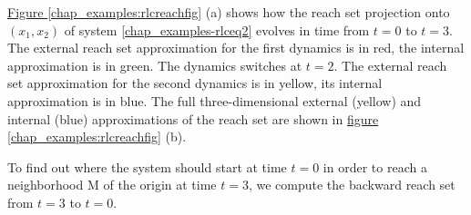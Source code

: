 \documentclass[letterpaper,10pt,english]{sphinxmanual}
\begin{document}
\hyperref[chap_examples:rlcreachfig]{Figure  \ref*{chap_examples:rlcreachfig}} (a) shows how the reach set projection onto
$(x_1, x_2)$ of system \eqref{chap_examples-rlceq2} evolves in time from $t=0$
to $t=3$. The external reach set approximation for the first
dynamics is in red, the internal approximation is in green. The dynamics
switches at $t=2$. The external reach set approximation for the
second dynamics is in yellow, its internal approximation is in blue. The
full three-dimensional external (yellow) and internal (blue)
approximations of the reach set are shown in \hyperref[chap_examples:rlcreachfig]{figure  \ref*{chap_examples:rlcreachfig}} (b).

To find out where the system should start at time $t=0$ in order
to reach a neighborhood M of the origin at time $t=3$, we compute
the backward reach set from $t=3$ to $t=0$.
\end{document}
